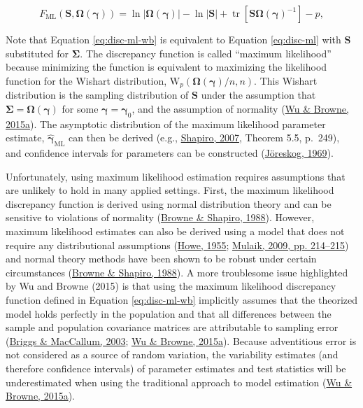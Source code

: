 \documentclass[11pt]{umnthesis}
\DeclareMathOperator{\tr}{tr}
\begin{document}
\begin{equation}
F_{\textrm{ML}}(\mathbf{S}, \bm{\Omega}(\bm{\gamma})) = \ln |\bm{\Omega}(\bm{\gamma})| - \ln |\mathbf{S}| + \tr [\mathbf{S} \bm{\Omega}(\bm{\gamma})^{-1}] - p,
\label{eq:disc-ml-wb}
\end{equation}

Note that Equation \eqref{eq:disc-ml-wb} is equivalent to Equation \eqref{eq:disc-ml} with \(\mathbf{S}\) substituted for \(\bm{\Sigma}\). The discrepancy function is called ``maximum likelihood'' because minimizing the function is equivalent to maximizing the likelihood function for the Wishart distribution, \(\textrm{W}_p(\bm{\Omega}(\bm{\gamma}) / n, n)\). This Wishart distribution is the sampling distribution of \(\mathbf{S}\) under the assumption that \(\bm{\Sigma} = \bm{\Omega}(\bm{\gamma})\) for some \(\bm{\gamma} = \bm{\gamma}_0\), and the assumption of normality (\protect\hyperlink{ref-wu2015}{Wu \& Browne, 2015a}). The asymptotic distribution of the maximum likelihood parameter estimate, \(\hat{\bm{\gamma}}_{\textrm{ML}}\) can then be derived (e.g., \protect\hyperlink{ref-shapiro2007}{Shapiro, 2007}, Theorem 5.5, p.~249), and confidence intervals for parameters can be constructed (\protect\hyperlink{ref-joreskog1969}{Jöreskog, 1969}).

Unfortunately, using maximum likelihood estimation requires assumptions that are unlikely to hold in many applied settings. First, the maximum likelihood discrepancy function is derived using normal distribution theory and can be sensitive to violations of normality (\protect\hyperlink{ref-browne1988}{Browne \& Shapiro, 1988}). However, maximum likelihood estimates can also be derived using a model that does not require any distributional assumptions (\protect\hyperlink{ref-howe1955}{Howe, 1955}; \protect\hyperlink{ref-mulaik2009foundations}{Mulaik, 2009, pp. 214--215}) and normal theory methods have been shown to be robust under certain circumstances (\protect\hyperlink{ref-browne1988}{Browne \& Shapiro, 1988}). A more troublesome issue highlighted by Wu and Browne (2015) is that using the maximum likelihood discrepancy function defined in Equation \eqref{eq:disc-ml-wb} implicitly assumes that the theorized model holds perfectly in the population and that all differences between the sample and population covariance matrices are attributable to sampling error (\protect\hyperlink{ref-briggs2003}{Briggs \& MacCallum, 2003}; \protect\hyperlink{ref-wu2015}{Wu \& Browne, 2015a}). Because adventitious error is not considered as a source of random variation, the variability estimates (and therefore confidence intervals) of parameter estimates and test statistics will be underestimated when using the traditional approach to model estimation (\protect\hyperlink{ref-wu2015}{Wu \& Browne, 2015a}).
\end{document}
